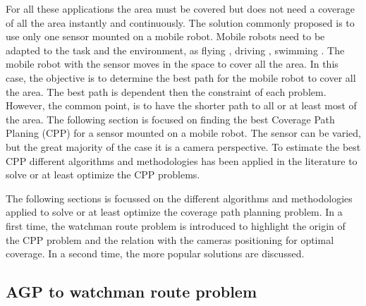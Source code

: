 For all these applications the area must be covered but does not need a coverage of all the area instantly and continuously. The solution commonly proposed is to use only one sensor mounted on a mobile robot. Mobile robots need to be adapted to the task and the environment, as flying  \citep{105*long1991}, driving \citep{30*bodor2005,213*roberts2008}, swimming \cite{66*galceran2013}. The mobile robot with the sensor moves in the space to cover all the area. In this case, the objective is to determine the best path for the mobile robot to cover all the area. The best path is dependent then the constraint of each problem. However, the common point, is to have the shorter path to all or at least most of the area.
The following section is focused on finding the best Coverage Path Planing (CPP) for a sensor mounted on a mobile robot. The sensor can be varied, but the great majority of the case it is a camera perspective. To estimate the best CPP different algorithms and methodologies has been applied in the literature to solve or at least optimize the CPP problems.

  The following sections is focussed on the different algorithms and methodologies applied to solve or at least optimize the coverage path planning problem. In a first time, the watchman route problem is introduced to highlight the origin of the CPP problem and the relation with the cameras positioning for optimal coverage. In a second time, the more popular solutions are discussed.
 





%
%





\subsection{AGP  to watchman route problem}



